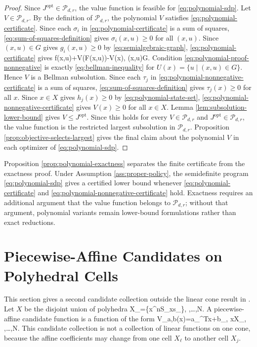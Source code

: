 \documentclass{article}
\begin{document}
\begin{proof}
Since $J^\textrm{opt}\in\mathcal P_{d,r}$, the value function is feasible for \eqref{eq:polynomial-sdp}. Let $V\in\mathcal P_{d,r}$. By the definition of $\mathcal P_{d,r}$, the polynomial $V$ satisfies \eqref{eq:polynomial-certificate}. Since each $\sigma_i$ in \eqref{eq:polynomial-certificate} is a sum of squares, \eqref{eq:sum-of-squares-definition} gives $\sigma_i(x,u)\geq 0$ for all $(x,u)$. Since $(x,u)\in G$ gives $g_i(x,u)\geq 0$ by \eqref{eq:semialgebraic-graph}, \eqref{eq:polynomial-certificate} gives
\BEQ
f(x,u)+\gamma V(F(x,u))-V(x),
\quad (x,u)\in G.
\label{eq:polynomial-proof-nonnegative}
\EEQ
Condition \eqref{eq:polynomial-proof-nonnegative} is exactly \eqref{eq:bellman-inequality} for $U(x)=\{u\mid (x,u)\in G\}$. Hence $V$ is a Bellman subsolution. Since each $\tau_j$ in \eqref{eq:polynomial-nonnegative-certificate} is a sum of squares, \eqref{eq:sum-of-squares-definition} gives $\tau_j(x)\geq 0$ for all $x$. Since $x\in X$ gives $h_j(x)\geq 0$ by \eqref{eq:polynomial-state-set}, \eqref{eq:polynomial-nonnegative-certificate} gives $V(x)\geq 0$ for all $x\in X$. Lemma \ref{lem:subsolution-lower-bound} gives $V\leq J^\textrm{opt}$. Since this holds for every $V\in\mathcal P_{d,r}$ and $J^\textrm{opt}\in\mathcal P_{d,r}$, the value function is the restricted largest subsolution in $\mathcal P_{d,r}$. Proposition \ref{prop:objective-selects-largest} gives the final claim about the polynomial $V$ in each optimizer of \eqref{eq:polynomial-sdp}.
\end{proof}

Proposition \ref{prop:polynomial-exactness} separates the finite certificate from the exactness proof. Under Assumption \ref{ass:proper-policy}, the semidefinite program \eqref{eq:polynomial-sdp} gives a certified lower bound whenever \eqref{eq:polynomial-certificate} and \eqref{eq:polynomial-nonnegative-certificate} hold. Exactness requires an additional argument that the value function belongs to $\mathcal P_{d,r}$; without that argument, polynomial variants remain lower-bound formulations rather than exact reductions.


\section{Piecewise-Affine Candidates on Polyhedral Cells}

This section gives a second candidate collection outside the linear cone result in \cite{pates-rantzer-cdc}. Let $X$ be the disjoint union of polyhedra
\BEQ
X_\ell=\{x\in\reals^n\mid S_\ell x\leq s_\ell\},
\quad {},\ldots,N.
\label{eq:polyhedral-state-cells}
\EEQ
A piecewise-affine candidate function is a function of the form
\BEQ
V_{a,b}(x)=a_\ell^Tx+b_\ell,
\quad x\in X_\ell,
\quad {},\ldots,N.
\label{eq:piecewise-affine-candidate}
\EEQ
This candidate collection is not a collection of linear functions on one cone, because the affine coefficients may change from one cell $X_\ell$ to another cell $X_j$.
\end{document}
